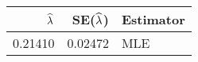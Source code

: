 \begin{table}[ht]
\centering
\begin{tabular}{rrl}
  \hline
$\widehat{\lambda}$ & SE($\widehat{\lambda}$) & Estimator \\ 
  \hline
0.21410 & 0.02472 & MLE \\ 
   \hline
\end{tabular}
\end{table}
